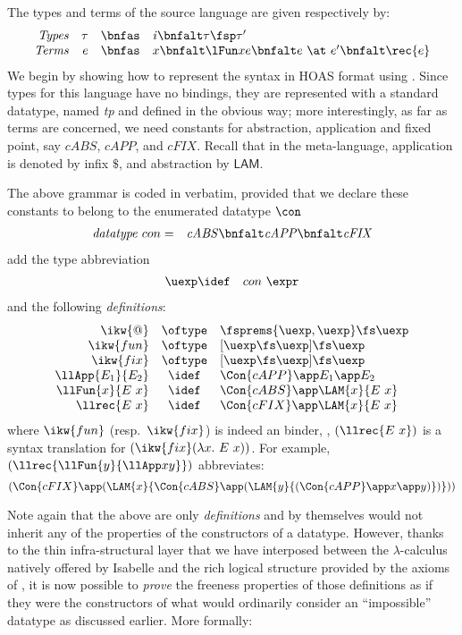 \documentclass[final]{svjour3}
\begin{document}
The types and terms of the source language are given respectively by:
\[ \begin{array}{rrcl}
 \mbox{\textit{Types}} & \tau & \bnfas & \mathit{i} \bnfalt \tau\fsp \tau' \\
 \mbox{\textit{Terms}}& e & \bnfas & x\bnfalt\lFun x e \bnfalt 
e\ \at \   e'\bnfalt  \rec{ e}\end{array} \]
We begin by showing how to represent the syntax in HOAS format using
\hybrid. Since  types for this language have no
bindings, they are represented with a standard datatype, named
\textit{tp} and defined in the obvious way;
more interestingly, as far as terms are
concerned, we need constants for
abstraction,   application and fixed point, say $\mathit{cABS}$,
$\mathit{cAPP}$, and $\mathit{cFIX}$.
Recall that in the meta-language, application is denoted by infix
$\$$, and abstraction by $\mathsf{LAM}$.

The above grammar is coded in \hybrid verbatim, provided that we declare
these constants to belong to the enumerated datatype $\con$
\begin{eqnarray*}
  \mathit{datatype}   \ con & =  & \mathit{cABS}\bnfalt\mathit{cAPP}\bnfalt \mathit{cFIX}
\end{eqnarray*}
add the {type} abbreviation
\begin{eqnarray*}
    \uexp &\idef &con\ \expr
\end{eqnarray*}
and the following  \emph{definitions}:
\[
\begin{array}{rcl}
  \ikw{@} &\oftype& \fsprems{\uexp, \uexp} \fs  \uexp       \\ 
  \ikw{fun} & \oftype &  [\uexp \fs  \uexp] \fs  \uexp  \\
  \ikw{fix} & \oftype &  [\uexp \fs  \uexp] \fs  \uexp  \\
  \llApp{E_1}{E_2} & \idef &  \Con{cAPP} \app E_1 \app E_2\\
  \llFun{x}{E\ x} & \idef &  \Con{cABS} \app \LAM{x}{E\ x}\\
  \llrec{E\ x} & \idef &  \Con{cFIX} \app \LAM{x}{E\ x}
\end{array}
\]
where $\ikw{fun}$ (resp.~$\ikw{fix}$) is indeed an \HOL binder, \eg,
$(\llrec{E\ x})$ is a syntax translation for $(\ikw{fix} (\lambda x.\ E
\ x))$.  
For example, $(\llrec{\llFun{y}{\llApp x y}})$ abbreviates:
\[
(\Con{cFIX} \app (\LAM{x }{\Con{cABS} \app (\LAM{y }{(\Con{cAPP} \app x \app y)})}))
\]



Note again that the above are only \emph{definitions} and by
themselves would not inherit any of the properties of the constructors
of a datatype.  However, thanks to the thin infra-structural layer
that we have interposed between the $\lambda$-calculus natively
offered by Isabelle and the rich logical structure provided by the
axioms of \HOL, it is now possible to \emph{prove} the freeness
properties of those definitions as if they were the constructors of
what \HOL would ordinarily consider an ``impossible'' datatype as
discussed earlier. More formally:
\end{document}
